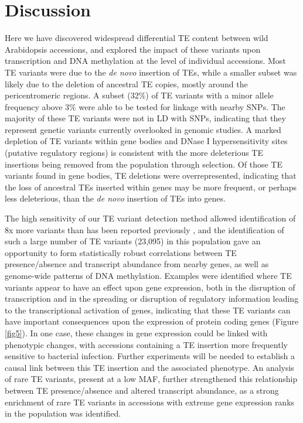 \documentclass[12pt]{article}
\begin{document}
\section{Discussion}

Here we have discovered widespread differential TE content between wild
Arabidopsis accessions, and explored the impact of these variants upon
transcription and DNA methylation at the level of individual accessions.
Most TE variants were due to the \emph{de novo }insertion of TEs, while
a smaller subset was likely due to the deletion of ancestral TE copies,
mostly around the pericentromeric regions. A subset (32\%) of TE
variants with a minor allele frequency above 3\% were able to be tested
for linkage with nearby SNPs. The majority of these TE variants were not
in LD with SNPs, indicating that they represent genetic variants
currently overlooked in genomic studies. A marked depletion of TE
variants within gene bodies and DNase I hypersensitivity sites (putative
regulatory regions) is consistent with the more deleterious TE
insertions being removed from the population through selection. Of those
TE variants found in gene bodies, TE deletions were overrepresented,
indicating that the loss of ancestral TEs inserted within genes may be
more frequent, or perhaps less deleterious, than the \emph{de novo
}insertion of TEs into genes.

The high sensitivity of our TE variant detection method allowed
identification of 8x more variants than has been reported previously
\cite{Quadrana:2016bi}, and the identification of such a large number of
TE variants (23,095) in this population gave an opportunity to form
statistically robust correlations between TE presence/absence and
transcript abundance from nearby genes, as well as genome-wide patterns
of DNA methylation. Examples were identified where TE variants appear to
have an effect upon gene expression, both in the disruption of
transcription and in the spreading or disruption of regulatory
information leading to the transcriptional activation of genes,
indicating that these TE variants can have important consequences upon
the expression of protein coding genes (Figure \ref{fig5}). In one case, these
changes in gene expression could be linked with phenotypic changes, with
accessions containing a TE insertion more frequently sensitive to
bacterial infection. Further experiments will be needed to establish a
causal link between this TE insertion and the associated phenotype. An
analysis of rare TE variants, present at a low MAF, further strengthened
this relationship between TE presence/absence and altered transcript
abundance, as a strong enrichment of rare TE variants in accessions with
extreme gene expression ranks in the population was identified.
\end{document}
